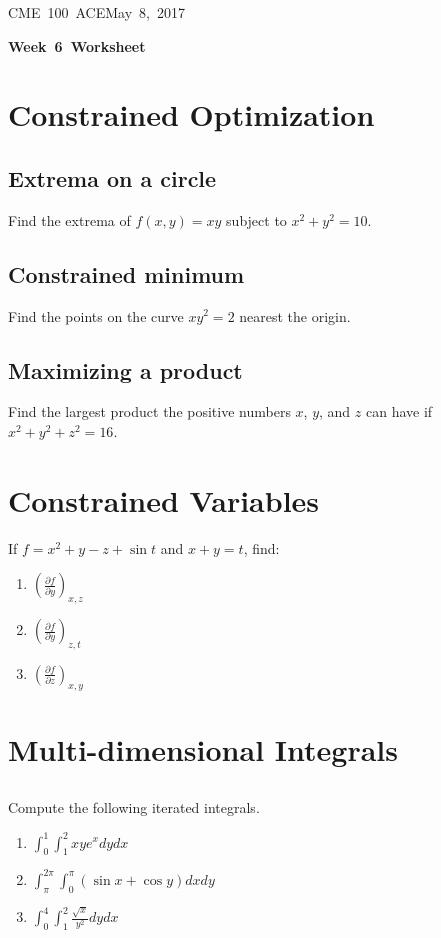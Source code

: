 \documentclass[letterpaper, 11pt]{article}
\makeatletter
\newcommand{\hmwkTitle}{Week\ 6\ Worksheet} %
\newcommand{\hmwkClass}{CME\ 100\ ACE} %
\newcommand{\hmwkAuthorName}{Timothy Anderson} %
\newcommand{\hmwkAuthorEmail}{timmya@stanford.edu} %
\makeatother
\begin{document}
\noindent
\normalsize 
\hmwkClass \hfill May\ 8,\ 2017\\

\begin{center} \Large \textbf{\hmwkTitle} \end{center}

\section{Constrained Optimization}
\subsection{Extrema on a circle} Find the extrema of $f(x,y) = xy$ subject to $x^2 + y^2 = 10$. 

\subsection{Constrained minimum} Find the points on the curve $xy^2 = 2$ nearest the origin.

\subsection{Maximizing a product} Find the largest product the positive numbers $x$, $y$, and $z$ can have if $x^2 + y^2 + z^2 = 16$.

\section{Constrained Variables}
If $f = x^2 + y - z + \sin t$ and $x + y = t$, find:
\begin{enumerate}[label=(\alph*)]
\item $\left( \frac{\partial f}{\partial y}\right)_{x,z}$

\item $\left( \frac{\partial f}{\partial y}\right)_{z,t}$

\item $\left( \frac{\partial f}{\partial z}\right)_{x,y}$

\end{enumerate}

\section{Multi-dimensional Integrals}
\subsection{} Compute the following iterated integrals. 
\begin{enumerate}[label=(\alph*)]
\item $\int_0^1 \int_1^2 x y e^x dy dx $

\item $\int_\pi^{2 \pi} \int_0^\pi (\sin x + \cos y) dx dy$

\item $\int_0^4 \int_1^2 \frac{\sqrt{x}}{y^2} dy dx$

\end{enumerate}
\end{document}

